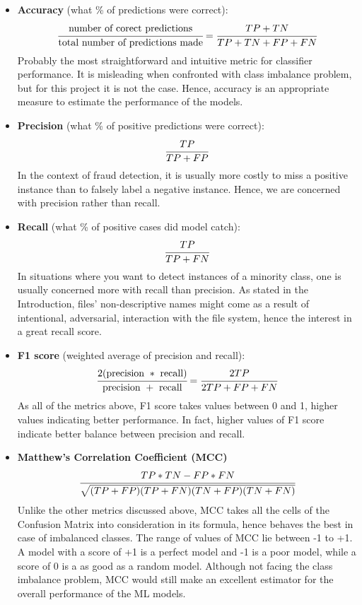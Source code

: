 \begin{itemize}
  \item \textbf{Accuracy} (what \% of predictions were correct): $$ \cfrac{\text{number of corect predictions}}{\text{total number of predictions made}} = \cfrac{TP + TN}{TP + TN + FP + FN}$$ 
        Probably the most straightforward and intuitive metric for classifier performance. It is misleading when confronted with class imbalance problem, but for this project it is not the case. Hence, accuracy is an appropriate measure to estimate the performance of the models. 

  \item \textbf{Precision} (what \% of positive predictions were correct): $$ \cfrac{TP}{TP + FP}$$
        In the context of fraud detection, it is usually more costly to miss a positive instance than to falsely label a negative instance. Hence, we are concerned with precision rather than recall. 

  \item \textbf{Recall} (what \% of positive cases did model catch): $$ \cfrac{TP}{TP + FN}$$ 
        In situations where you want to detect instances of a minority class, one is usually concerned more with recall than precision. As stated in the Introduction, files' non-descriptive names might come as a result of intentional, adversarial, interaction with the file system, hence the interest in a great recall score.\\

  \item \textbf{F1 score} (weighted average of precision and recall): $$ \cfrac{2(\text{precision} \ * \ \text{recall})}{\text{precision} \ + \ \text{recall}} = \cfrac{2TP}{2TP + FP + FN}$$ 
        As all of the metrics above, F1 score takes values between 0 and 1, higher values indicating better performance. In fact, higher values of F1 score indicate better balance between precision and recall. 

  \item \textbf{Matthew's Correlation Coefficient (MCC)} $$ \cfrac{TP * TN - FP * FN}{\sqrt{(TP + FP)(TP + FN)(TN + FP)(TN + FN)}}$$ 
        Unlike the other metrics discussed above, MCC takes all the cells of the Confusion Matrix into consideration in its formula, hence behaves the best in case of imbalanced classes. The range of values of MCC lie between -1 to +1. A model with a score of +1 is a perfect model and -1 is a poor model, while a score of 0 is a as good as a random model. Although not facing the class imbalance problem, MCC would still make an excellent estimator for the overall performance of the ML models.
\end{itemize}


